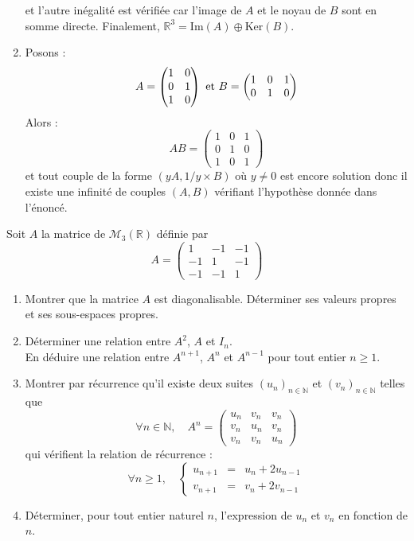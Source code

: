 \documentclass[a4paper,10pt]{report}
\begin{document}
\begin{enumerate}
et l'autre inégalité est vérifiée car l'image de $A$ et le noyau de $B$ sont en somme directe. Finalement, $\mathbb{R}^3 = \textrm{Im}(A) \oplus \textrm{Ker}(B)$.
\item Posons :
$$ A  = \begin{pmatrix}
1 & 0 \\
0 & 1\\
1 & 0 \\
\end{pmatrix} 
\hbox{ et } B = \begin{pmatrix}
1 & 0 & 1 \\
0 & 1 & 0
\end{pmatrix}$$
Alors :
$$ AB = \begin{pmatrix}
1 & 0 & 1 \\
0 & 1 & 0 \\
1 & 0 & 1 
\end{pmatrix}$$
et tout couple de la forme $(yA, 1/y \times B)$ où $y \neq 0$ est encore solution donc il existe une infinité de couples $(A,B)$ vérifiant l'hypothèse donnée dans l'énoncé.
\end{enumerate}

\begin{Exa}
Soit $A$ la matrice de $\mathcal{M}_{3}\left(\mathbb{R}\right)$
d\'efinie par
\[
A=\left(\begin{array}{ccc}
1 & -1 & -1\\
-1 & 1 & -1\\
-1 & -1 & 1
\end{array}\right)
\]

\begin{enumerate}
\item Montrer que la matrice $A$ est diagonalisable. D\'eterminer ses valeurs propres et ses sous-espaces propres.
\item D\'eterminer une relation entre $A^{2}$, $A$ et $I_{n}$.\\
En d\'eduire une relation entre $A^{n+1}$, $A^{n}$ et $A^{n-1}$ pour
tout entier $n\geq1$.
\item Montrer par r\'ecurrence qu'il existe deux suites $\left(u_{n}\right)_{n\in\mathbb{N}}$
et $\left(v_{n}\right)_{n\in\mathbb{N}}$ telles que
\[
\forall n\in\mathbb{N},\quad A^{n}=\left(\begin{array}{ccc}
u_{n} & v_{n} & v_{n}\\
v_{n} & u_{n} & v_{n}\\
v_{n} & v_{n} & u_{n}
\end{array}\right)
\]
qui v\'erifient la relation de r\'ecurrence :
\[
\forall n\geq1,\quad\left\{ \begin{array}{ccc}
u_{n+1} & = & u_{n}+2u_{n-1}\\
v_{n+1} & = & v_{n}+2v_{n-1}
\end{array}\right.
\]
\item D\'eterminer, pour tout entier naturel $n$, l'expression de $u_{n}$
et $v_{n}$ en fonction de $n$.
\end{enumerate}
\end{Exa}
\end{document}
